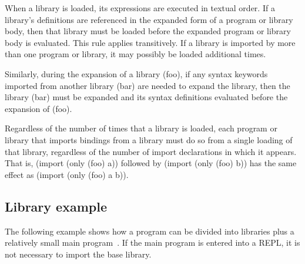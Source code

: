 When a library is loaded, its expressions are executed
in textual order.
If a library's definitions are referenced in the expanded form of a
program or library body, then that library must be loaded before the
expanded program or library body is evaluated. This rule applies
transitively.  If a library is imported by more than one program or
library, it may possibly be loaded additional times.

Similarly, during the expansion of a library {\cf (foo)}, if any syntax
keywords imported from another library {\cf (bar)} are needed to expand
the library, then the library {\cf (bar)} must be expanded and its syntax
definitions evaluated before the expansion of {\cf (foo)}.

Regardless of the number of times that a library is loaded, each
program or library that imports bindings from a library must do so from a
single loading of that library, regardless of the number of import
declarations in which it appears.
That is, {\cf (import (only (foo) a))} followed by {\cf (import (only (foo) b))}
has the same effect as {\cf (import (only (foo) a b))}.

\subsection{Library example}
The following example shows
how a program can be divided into libraries plus a relatively small
main program~\cite{life}.
If the main program is entered into a REPL, it is not necessary to import
the base library.

